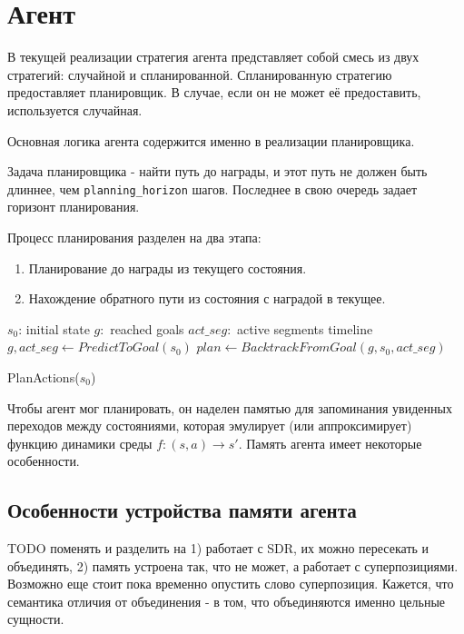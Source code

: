 \documentclass[a4paper]{article}
\begin{document}
\section{Агент}

В текущей реализации стратегия агента представляет собой смесь из двух стратегий: случайной и спланированной. Спланированную стратегию предоставляет планировщик. В случае, если он не может её предоставить, используется случайная.

Основная логика агента содержится именно в реализации планировщика.

Задача планировщика - найти путь до награды, и этот путь не должен быть длиннее, чем \verb|planning_horizon| шагов. Последнее в свою очередь задает горизонт планирования.

Процесс планирования разделен на два этапа:

\begin{enumerate}
    \item Планирование до награды из текущего состояния.
    \item Нахождение обратного пути из состояния с наградой в текущее.
\end{enumerate}

\begin{function}
  \SetAlgoNoLine
  $s_0$: initial state \;
  $g: $ reached goals \;
  $act\_seg: $ active segments timeline \;
  \quad \\

  $g, act\_seg \leftarrow PredictToGoal(s_0)$ \;
  $plan \leftarrow BacktrackFromGoal(g, s_0, act\_seg)$ \;

  \caption{PlanActions($s_0$)}
\end{function}

Чтобы агент мог планировать, он наделен памятью для запоминания увиденных переходов между состояниями, которая эмулирует (или аппроксимирует) функцию динамики среды $f: (s, a) \rightarrow s'$. Память агента имеет некоторые особенности.

\subsection{Особенности устройства памяти агента}

TODO поменять и разделить на 1) работает с SDR, их можно пересекать и объединять, 2) память устроена так, что не может, а работает с суперпозициями. Возможно еще стоит пока временно опустить слово суперпозиция. Кажется, что семантика отличия от объединения - в том, что объединяются именно цельные сущности.
\end{document}
